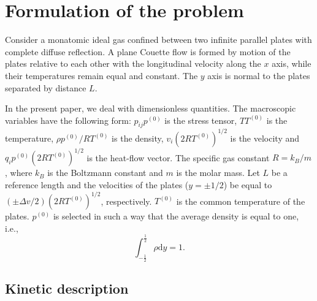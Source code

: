 \documentclass[]{elsarticle} %
\newcommand{\dd}{\mathrm{d}}
\begin{document}
\section{Formulation of the problem}

Consider a monatomic ideal gas confined between two infinite parallel plates
with complete diffuse reflection.
A plane Couette flow is formed by motion of the plates relative to each other
with the longitudinal velocity along the \(x\) axis,
while their temperatures remain equal and constant.
The \(y\) axis is normal to the plates separated by distance \(L\).

In the present paper, we deal with dimensionless quantities. The macroscopic variables
have the following form: \(p_{ij}p^{(0)}\) is the stress tensor, \(TT^{(0)}\) is the temperature,
\(\rho p^{(0)}/RT^{(0)}\) is the density, \(v_i(2RT^{(0)})^{1/2}\) is the velocity
and \(q_ip^{(0)}(2RT^{(0)})^{1/2}\) is the heat-flow vector.
The specific gas constant \(R = k_B/m\), where \(k_B\) is the Boltzmann constant
and \(m\) is the molar mass.
Let \(L\) be a reference length and the velocities of the plates (\(y=\pm1/2\))
be equal to \((\pm\Delta{v}/2)(2RT^{(0)})^{1/2}\), respectively.
\(T^{(0)}\) is the common temperature of the plates.
\(p^{(0)}\) is selected in such a way that the average density is equal to one, i.e.,
\begin{equation}\label{eq:total_mass}
    \int_{-\frac12}^\frac12\rho\dd{y} = 1.
\end{equation}

\subsection{Kinetic description}
\end{document}
